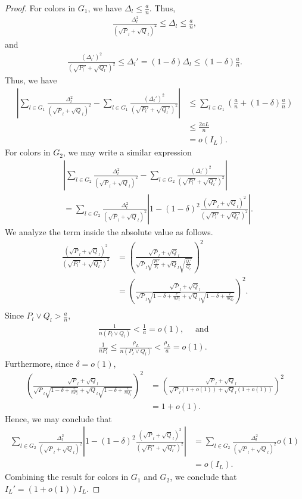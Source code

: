 \documentclass{article}
\begin{document}
\begin{proof}
For colors in $G_1$, we have $\Delta_l \leq \frac{a}{n}$. Thus,
\begin{align*}
\frac{\Delta_l^2}{(\sqrt P_l + \sqrt Q_l)^2} \leq \Delta_l \leq \frac{a}{n},
\end{align*}
and
\begin{align*}
\frac{(\Delta_l')^2}{(\sqrt {P_l'} + \sqrt {Q_l'})^2} \leq \Delta_l' = (1-\delta)\Delta_l \leq (1-\delta) \frac{a}{n}.
\end{align*}
Thus, we have
\begin{align*}
\left | \sum_{l \in G_1} \frac{\Delta_l^2}{(\sqrt P_l + \sqrt Q_l)^2} - \sum_{l \in G_1} \frac{(\Delta_l')^2}{(\sqrt{P_l'} + \sqrt{Q_l'})^2} \right | &\leq \sum_{l \in G_1} \left(\frac{a}{n} + (1-\delta)\frac{a}{n} \right)\\
&\leq \frac{2aL}{n}\\
&= o(I_L).
\end{align*}
For colors in $G_2$, we may write a similar expression
\begin{align*}
&\left | \sum_{l \in G_2} \frac{\Delta_l^2}{(\sqrt P_l + \sqrt Q_l)^2} - \sum_{l \in G_2} \frac{(\Delta_l')^2}{(\sqrt{P_l'} + \sqrt{Q_l'})^2} \right |\\
&= \sum_{l \in G_2} \frac{\Delta_l^2}{(\sqrt P_l + \sqrt Q_l)^2} \left | 1 - (1-\delta)^2\frac{(\sqrt P_l + \sqrt Q_l)^2}{(\sqrt{P_l'} + \sqrt{Q_l'})^2} \right |.
\end{align*}
We analyze the term inside the absolute value as follows.
\begin{align*}
\frac{(\sqrt P_l + \sqrt Q_l)^2}{(\sqrt{P_l'} + \sqrt{Q_l'})^2} &= \left(\frac{\sqrt P_l + \sqrt Q_l}{\sqrt P_l \sqrt{\frac{P_l'}{P_l}} + \sqrt Q_l \sqrt{\frac{Q_l'}{Q_l}}}\right)^2\\
&=  \left(\frac{\sqrt P_l + \sqrt Q_l}{\sqrt P_l \sqrt{1-\delta + \frac{c}{nP_l}} + \sqrt Q_l \sqrt{1-\delta + \frac{c}{nQ_l}}}\right)^2.\\
\end{align*}
Since $P_l \vee Q_l > \frac{a}{n}$,
\begin{align*}
\frac{1}{n(P_l \vee Q_l)} < \frac{1}{a} = o(1), \quad \text{ and }\\
\frac{1}{nP_l} \leq \frac{\rho_L}{n(P_l \vee Q_l)} < \frac{\rho_L}{a} = o(1).
\end{align*}
Furthermore, since $\delta = o(1)$, 
\begin{align*}
\left(\frac{\sqrt P_l + \sqrt Q_l}{\sqrt P_l \sqrt{1-\delta + \frac{c}{nP_l}} + \sqrt Q_l \sqrt{1-\delta + \frac{c}{nQ_l}}}\right)^2 &= \left(\frac{\sqrt P_l + \sqrt Q_l}{\sqrt P_l (1+o(1)) + \sqrt Q_l (1+o(1))}\right)^2\\
&= 1+o(1).
\end{align*}
Hence, we may conclude that
\begin{align*}
 \sum_{l \in G_2} \frac{\Delta_l^2}{(\sqrt P_l + \sqrt Q_l)^2} \left | 1 - (1-\delta)^2\frac{(\sqrt P_l + \sqrt Q_l)^2}{(\sqrt{P_l'} + \sqrt{Q_l'})^2} \right | &=  \sum_{l \in G_2} \frac{\Delta_l^2}{(\sqrt P_l + \sqrt Q_l)^2} o(1)\\
 &= o(I_L).
\end{align*}
Combining the result for colors in $G_1$ and $G_2$, we conclude that $I_L' = (1+o(1)) I_L.$
\end{proof}
\end{document}
